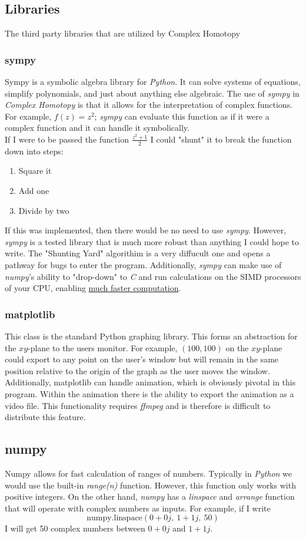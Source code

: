 \documentclass{article}
\begin{document}
    \subsection{Libraries}
    The third party libraries that are utilized by Complex Homotopy
        \subsubsection{sympy}
        Sympy is a symbolic algebra library for \textit{Python}. It can solve systems of equations, simplify polynomials, and just about anything else algebraic. The use of \textit{sympy} in \textit{Complex Homotopy} is that it allows for the interpretation of complex functions. For example, $f(z) = z^{2}$; \textit{sympy} can evaluate this function as if it were a complex function and it can handle it symbolically.\\
        If I were to be passed the function $\frac{z^{2} + 1}{2}$ I could "shunt" it to break the function down into steps:
        \begin{enumerate}
            \item Square it
            \item Add one
            \item Divide by two
        \end{enumerate}
        If this was implemented, then there would be no need to use \textit{sympy}. However, \textit{sympy} is a tested library that is much more robust than anything I could hope to write. The "Shunting Yard" algorithim is a very diffucult one and opens a pathway for bugs to enter the program. Additionally, \textit{sympy} can make use of \textit{numpy}'s ability to "drop-down" to \textit{C} and run calculations on the SIMD processors of your CPU, enabling  \href{http://docs.sympy.org/dev/modules/numeric-computation.html}{much faster computation}.
        \subsubsection{matplotlib}
        This class is the standard Python graphing library. This forms an abstraction for the $xy$-plane to the users monitor. For example, $(100,100)$ on the $xy$-plane could export to any point on the user's window but will remain in the same position relative to the origin of the graph as the user moves the window. Additionally, matplotlib can handle animation, which is obviously pivotal in this program. Within the animation there is the ability to export the animation as a video file. This functionality requires \textit{ffmpeg} and is therefore is difficult to distribute this feature.
        \subsection{numpy}
        Numpy allows for fast calculation of ranges of numbers. Typically in \textit{Python} we would use the built-in \textit{range(n)} function. However, this function only works with positive integers. On the other hand, \textit{numpy} has a \textit{linspace} and \textit{arrange} function that will operate with complex numbers as inputs. For example, if I write
        $$\text{numpy.linspace}(0+0j,\ 1+1j,\ 50)$$
        I will get 50 complex numbers between $0+0j$ and $1+1j$.
    
\end{document}
